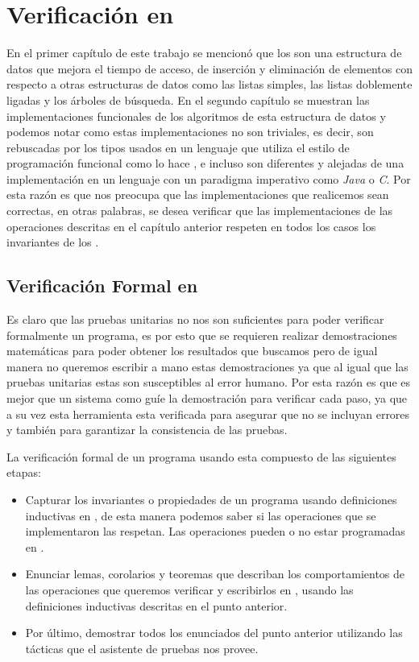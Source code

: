 \chapter{Verificación en {\coq}}

En el primer cap\'itulo de este trabajo se mencion\'o que los {\arns} son una estructura de datos
que mejora el tiempo de acceso, de inserción y eliminación de elementos con respecto a otras
estructuras de datos como las listas simples, las listas doblemente ligadas y los \'arboles de
búsqueda. En el segundo cap\'itulo se muestran las implementaciones funcionales de los algoritmos de esta
estructura de datos y podemos notar como estas implementaciones no son triviales, es decir, son
rebuscadas por los tipos usados en un lenguaje que utiliza el estilo de programaci\'on funcional como
lo hace {\coq}, e incluso son diferentes y alejadas de una implementaci\'on en un lenguaje con un paradigma imperativo como \textit{Java} o \textit{C}.
Por esta razón es que nos preocupa que las implementaciones que realicemos sean correctas, en otras palabras, se desea verificar que las implementaciones de las operaciones
descritas en el cap\'itulo anterior respeten en todos los casos los invariantes de los {\arns}.


\section{Verificaci\'on Formal en {\coq}}

Es claro que las pruebas unitarias no nos son suficientes para poder verificar formalmente un
programa, es por esto que se requieren realizar demostraciones matemáticas para poder obtener los
resultados que buscamos pero de igual manera no queremos escribir a mano estas demostraciones ya
que al igual que las pruebas unitarias estas son susceptibles al error humano. Por esta raz\'on es que es mejor que un sistema como {\coq} guíe la demostraci\'on para verificar cada paso, ya que a su vez esta herramienta esta verificada para asegurar que no se incluyan errores y también para garantizar la consistencia de las pruebas\cite{Geuvers2009}.

La verificaci\'on formal de un programa usando {\coq} esta compuesto de las siguientes etapas:
\begin{itemize}
    \item Capturar los invariantes o propiedades de un programa usando definiciones inductivas en {\coq}, de
    esta manera podemos saber si las operaciones que se implementaron las respetan. Las operaciones pueden o no estar programadas en {\coq}.
    \item Enunciar lemas, corolarios y teoremas que describan los comportamientos de las
    operaciones que queremos verificar y escribirlos en {\coq}, usando las definiciones inductivas
    descritas en el punto anterior.
    \item Por \'ultimo, demostrar todos los enunciados del punto anterior utilizando las t\'acticas
    que el asistente de pruebas nos provee.
\end{itemize}{}

